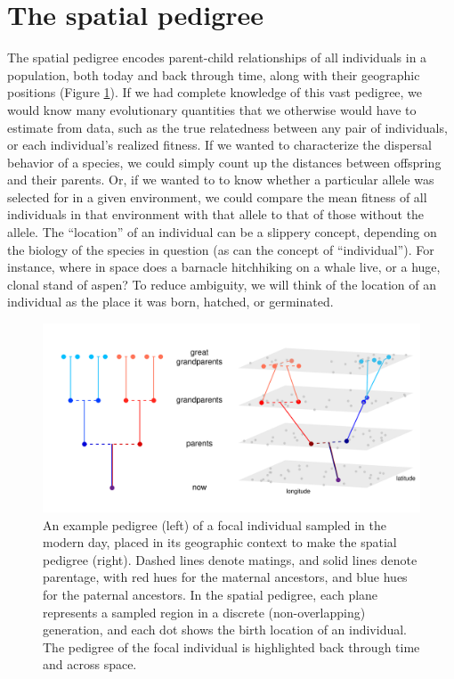 \documentclass{ar-1col}
\newcommand{\plr}[1]{{\color{green}{#1}}}
\begin{document}
\plr{perhaps we need a note about how we explictly don't cover the very fine history of spatial models?}


\section{The spatial pedigree}

The spatial pedigree 
encodes parent-child relationships of all individuals in a population,
both today and back through time,
along with their geographic positions (Figure \ref{spatial_pedigree}).
If we had complete knowledge of this vast pedigree,
we would know many evolutionary quantities
that we otherwise would have to estimate from data,
such as the true relatedness between any pair of individuals,
or each individual's realized fitness.
If we wanted to characterize the dispersal behavior of a species,
we could simply count up the distances between offspring and their parents.
Or, if we wanted to to know whether a particular allele
was selected for in a given environment,
we could compare the mean fitness of all individuals in that environment with that allele
to that of those without the allele.
The ``location'' of an individual can be a slippery concept,
depending on the biology of the species in question
(as can the concept of ``individual'').
For instance, 
where in space does a barnacle hitchhiking on a whale live, 
or a huge, clonal stand of aspen?
To reduce ambiguity,
we will think of the location of an individual as the place it was
born, hatched, or germinated.

\begin{figure}
    \centering
         \includegraphics[width=\linewidth]{spatial_pedigree.pdf}
        \caption{
		An example pedigree (left) of a focal individual sampled in the modern day, 
	   	placed in its geographic context to make the spatial pedigree (right).
		Dashed lines denote matings, and solid lines denote parentage, 
		with red hues for the maternal ancestors, 
		and blue hues for the paternal ancestors.
		In the spatial pedigree, 
		each plane represents a sampled region in a discrete (non-overlapping) generation,
		and each dot shows the birth location of an individual.
		The pedigree of the focal individual is highlighted 
		back through time and across space.
        }
        \label{spatial_pedigree}
\end{figure}
\end{document}

